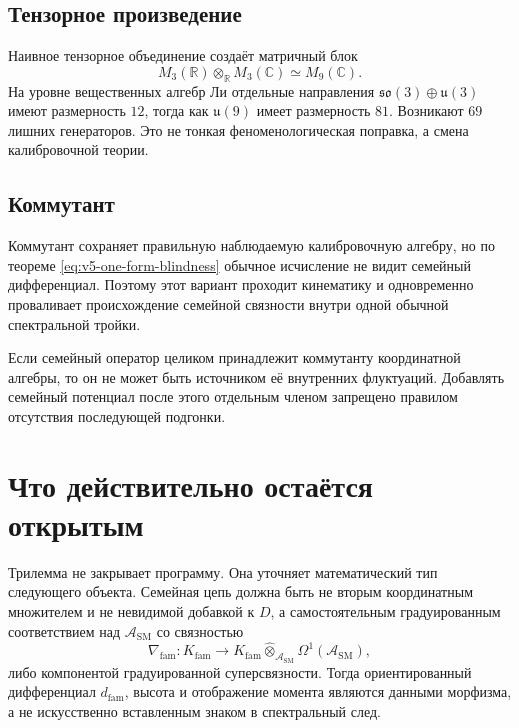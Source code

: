 \subsection{Тензорное произведение}

Наивное тензорное объединение создаёт матричный блок
\begin{equation}
 M_3(\mathbb R)\otimes_{\mathbb R}M_3(\mathbb C)
 \simeq M_9(\mathbb C).
\end{equation}
На уровне вещественных алгебр Ли отдельные направления
$\mathfrak{so}(3)\oplus\mathfrak u(3)$ имеют размерность $12$, тогда как
$\mathfrak u(9)$ имеет размерность $81$. Возникают $69$ лишних генераторов.
Это не тонкая феноменологическая поправка, а смена калибровочной теории.

\subsection{Коммутант}

Коммутант сохраняет правильную наблюдаемую калибровочную алгебру, но по
теореме \eqref{eq:v5-one-form-blindness} обычное исчисление не видит
семейный дифференциал. Поэтому этот вариант проходит кинематику и
одновременно проваливает происхождение семейной связности внутри одной
обычной спектральной тройки.

\begin{nogocriterion}
Если семейный оператор целиком принадлежит коммутанту координатной алгебры,
то он не может быть источником её внутренних флуктуаций. Добавлять семейный
потенциал после этого отдельным членом запрещено правилом отсутствия
последующей подгонки.
\end{nogocriterion}

\section{Что действительно остаётся открытым}

Трилемма не закрывает программу. Она уточняет математический тип следующего
объекта. Семейная цепь должна быть не вторым координатным множителем и не
невидимой добавкой к $D$, а самостоятельным градуированным соответствием
над $\mathcal A_{\mathrm{SM}}$ со связностью
\begin{equation}
 \nabla_{\mathrm{fam}}:
 K_{\mathrm{fam}}\longrightarrow
 K_{\mathrm{fam}}\widehat\otimes_{\mathcal A_{\mathrm{SM}}}
 \Omega^1(\mathcal A_{\mathrm{SM}}),
\end{equation}
либо компонентой градуированной суперсвязности. Тогда ориентированный
дифференциал $d_{\mathrm{fam}}$, высота и отображение момента являются
данными морфизма, а не искусственно вставленным знаком в спектральный след.

